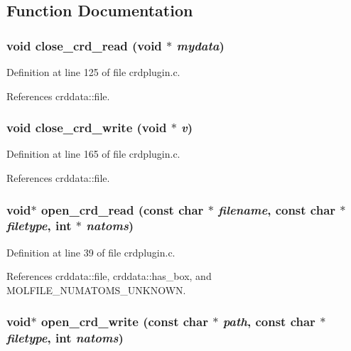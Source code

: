 \subsection{Function Documentation}
\subsubsection{\setlength{\rightskip}{0pt plus 5cm}void close\_\-crd\_\-read (void $\ast$ {\em mydata})\hspace{0.3cm}{\tt  [static]}}\label{crdplugin_8c_a4}




Definition at line 125 of file crdplugin.c.

References crddata::file.
\subsubsection{\setlength{\rightskip}{0pt plus 5cm}void close\_\-crd\_\-write (void $\ast$ {\em v})\hspace{0.3cm}{\tt  [static]}}\label{crdplugin_8c_a7}




Definition at line 165 of file crdplugin.c.

References crddata::file.
\subsubsection{\setlength{\rightskip}{0pt plus 5cm}void$\ast$ open\_\-crd\_\-read (const char $\ast$ {\em filename}, const char $\ast$ {\em filetype}, int $\ast$ {\em natoms})\hspace{0.3cm}{\tt  [static]}}\label{crdplugin_8c_a2}




Definition at line 39 of file crdplugin.c.

References crddata::file, crddata::has\_\-box, and MOLFILE\_\-NUMATOMS\_\-UNKNOWN.
\subsubsection{\setlength{\rightskip}{0pt plus 5cm}void$\ast$ open\_\-crd\_\-write (const char $\ast$ {\em path}, const char $\ast$ {\em filetype}, int {\em natoms})\hspace{0.3cm}{\tt  [static]}}\label{crdplugin_8c_a5}





